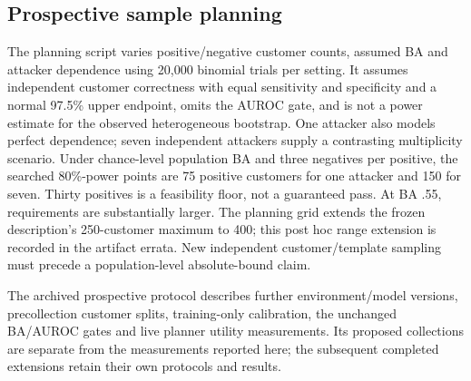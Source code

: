\subsection{Prospective sample planning}
The planning script varies positive/negative customer counts, assumed BA and attacker dependence using 20,000 binomial trials per setting. It assumes independent customer correctness with equal sensitivity and specificity and a normal 97.5\% upper endpoint, omits the AUROC gate, and is not a power estimate for the observed heterogeneous bootstrap. One attacker also models perfect dependence; seven independent attackers supply a contrasting multiplicity scenario. Under chance-level population BA and three negatives per positive, the searched 80\%-power points are 75 positive customers for one attacker and 150 for seven. Thirty positives is a feasibility floor, not a guaranteed pass. At BA .55, requirements are substantially larger. The planning grid extends the frozen description's 250-customer maximum to 400; this post hoc range extension is recorded in the artifact errata. New independent customer/template sampling must precede a population-level absolute-bound claim.


The archived prospective protocol describes further environment/model versions, precollection customer splits, training-only calibration, the unchanged BA/AUROC gates and live planner utility measurements. Its proposed collections are separate from the measurements reported here; the subsequent completed extensions retain their own protocols and results.
